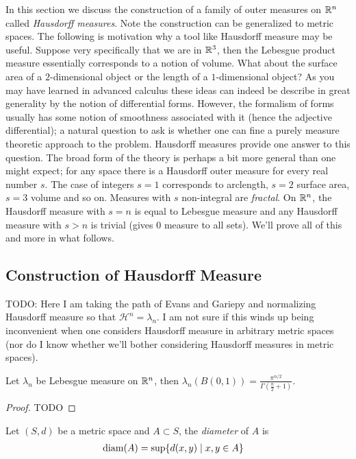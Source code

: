In this section we discuss the construction of a family of outer
measures on $\mathbb{R}^n$ called \emph{Hausdorff measures}.  Note the
construction can be generalized to metric spaces.  The following is
motivation why a tool like Hausdorff measure may be useful.  Suppose
very specifically that we are
in $\mathbb{R}^3$, then the Lebesgue product measure essentially
corresponds to a notion of volume.  What about the surface area of a
$2$-dimensional object or the length of a $1$-dimensional object?  As
you may have learned in advanced calculus these ideas can indeed be
describe in great generality by the notion of differential forms.
However, the formalism of forms usually has some notion of smoothness
associated with it (hence the adjective differential); a natural question to ask is whether one can fine
a purely measure theoretic approach to the problem.  Hausdorff measures
provide one answer to this question.   The broad form of the theory
is perhaps a bit more general than one might expect; for any space
there is a Hausdorff outer measure for every real number $s$.  The
case of integers
$s=1$ corresponds to arclength, $s=2$ surface area, $s=3$ volume and so
on.  Measures with $s$ non-integral are
\emph{fractal}.  On $\mathbb{R}^n$, the Hausdorff measure with $s=n$ is equal to
Lebesgue measure and any Hausdorff measure with $s > n$ is trivial
(gives $0$ measure to all sets).  We'll prove all of this and more in
what follows.

\subsection{Construction of Hausdorff Measure}

TODO:  Here I am taking the path of Evans and Gariepy and normalizing
Hausdorff measure so that $\mathcal{H}^n = \lambda_n$.  I am not sure
if this winds up being inconvenient when one considers Hausdorff
measure in arbitrary metric spaces (nor do I know whether we'll bother
considering Hausdorff measures in metric spaces).

\begin{lem}Let $\lambda_n$ be Lebesgue measure on $\mathbb{R}^n$, then
  $\lambda_n(B(0, 1)) = \frac{\pi^{n/2}}{\Gamma(\frac{n}{2} + 1)}$.
\end{lem}
\begin{proof}
TODO
\end{proof}

\begin{defn}Let $(S,d)$ be a metric space and $A \subset S$, the
  \emph{diameter} of $A$ is 
\begin{align*}
\operatorname*{diam}(A) &= \sup \lbrace d(x,y) \mid x,y \in A \rbrace
\end{align*}
\end{defn}

